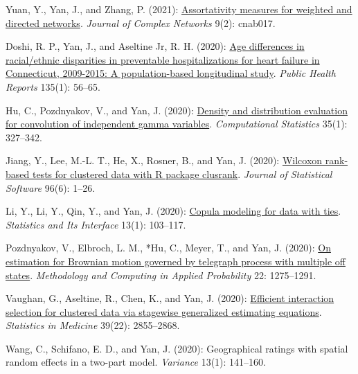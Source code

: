 \begin{RefereedJournalArticles}
\item *Yuan, Y., Yan, J., and Zhang, P. (2021):
\href{https://doi.org/10.1093/comnet/cnab017}{Assortativity measures for
weighted and directed networks}. \emph{Journal of Complex Networks}
9(2): cnab017.

\item *Doshi, R. P., Yan, J., and Aseltine Jr, R. H. (2020):
\href{https://doi.org/10.1177/0033354919884306}{Age differences in
racial/ethnic disparities in preventable hospitalizations for heart
failure in Connecticut, 2009-2015: A population-based longitudinal
study}. \emph{Public Health Reports} 135(1): 56--65.

\item *Hu, C., Pozdnyakov, V., and Yan, J. (2020):
\href{https://doi.org/10.1007/s00180-019-00924-9}{Density and
distribution evaluation for convolution of independent gamma variables}.
\emph{Computational Statistics} 35(1): 327--342.

\item *Jiang, Y., Lee, M.-L. T., He, X., Rosner, B., and Yan, J.
(2020): \href{https://doi.org/10.18637/jss.v096.i06}{Wilcoxon rank-based
tests for clustered data with R package clusrank}. \emph{Journal of
Statistical Software} 96(6): 1--26.

\item *Li, Y., Li, Y., Qin, Y., and Yan, J. (2020):
\href{https://doi.org/10.4310/SII.2020.v13.n1.a9}{Copula modeling for
data with ties}. \emph{Statistics and Its Interface} 13(1): 103--117.

\item Pozdnyakov, V., Elbroch, L. M., *Hu, C., Meyer, T., and Yan,
J. (2020): \href{https://doi.org/10.1007/s11009-020-09774-1}{On
estimation for Brownian motion governed by telegraph process with
multiple off states}. \emph{Methodology and Computing in Applied
Probability} 22: 1275--1291.

\item *Vaughan, G., Aseltine, R., Chen, K., and Yan, J. (2020):
\href{https://doi.org/10.1002/sim.8574}{Efficient interaction selection
for clustered data via stagewise generalized estimating equations}.
\emph{Statistics in Medicine} 39(22): 2855--2868.

\item *Wang, C., Schifano, E. D., and Yan, J. (2020): Geographical
ratings with spatial random effects in a two-part model. \emph{Variance}
13(1): 141--160.


\end{RefereedJournalArticles}
